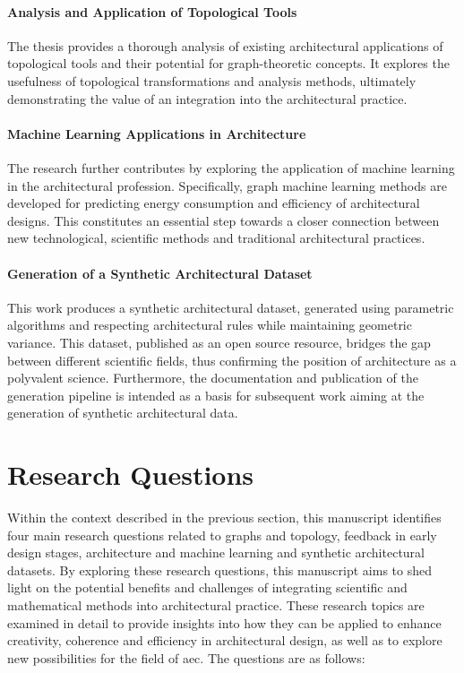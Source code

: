\documentclass[a4paper, 12pt]{report}
\begin{document}
\paragraph{Analysis and Application of Topological Tools}

The thesis provides a thorough analysis of existing architectural applications of topological tools and their potential for graph-theoretic concepts. It explores the usefulness of topological transformations and analysis methods, ultimately demonstrating the value of an integration into the architectural practice.

\paragraph{Machine Learning Applications in Architecture}

The research further contributes by exploring the application of machine learning in the architectural profession. Specifically, graph machine learning methods are developed for predicting energy consumption and efficiency of architectural designs. This constitutes an essential step towards a closer connection between new technological, scientific methods and traditional architectural practices.

\paragraph{Generation of a Synthetic Architectural Dataset}

This work produces a synthetic architectural dataset, generated using parametric algorithms and respecting architectural rules while maintaining geometric variance. This dataset, published as an \gls{open source} resource, bridges the gap between different scientific fields, thus confirming the position of architecture as a polyvalent science. Furthermore, the documentation and publication of the generation pipeline is intended as a basis for subsequent work aiming at the generation of synthetic architectural data.

\section{Research Questions}\label{sec:research-questions}

Within the context described in the previous section, this manuscript identifies four main research questions related to graphs and topology, feedback in early design stages, architecture and machine learning and synthetic architectural datasets. By exploring these research questions, this manuscript aims to shed light on the potential benefits and challenges of integrating scientific and mathematical methods into architectural practice. These research topics are examined in detail to provide insights into how they can be applied to enhance creativity, coherence and efficiency in architectural design, as well as to explore new possibilities for the field of \acrshort{aec}. The questions are as follows:
\end{document}
